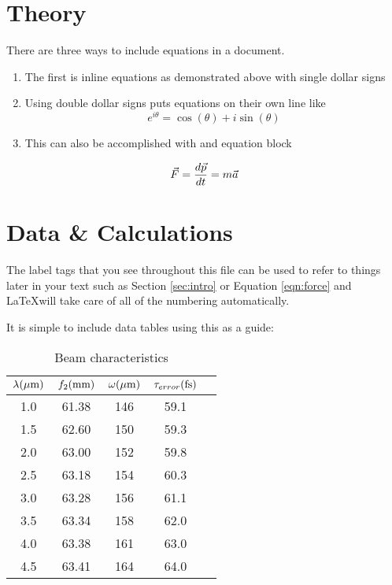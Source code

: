 \documentclass[10pt]{article}
\begin{document}
\section{Theory}
There are three ways to include equations in a document.
\begin{enumerate}
	\item The first is inline equations as demonstrated above with single dollar signs
	\item Using double dollar signs puts equations on their own line like $$e^{i \theta} = \cos(\theta) + i \sin(\theta)$$
	\item This can also be accomplished with and equation block
\end{enumerate}

\begin{equation} \label{eqn:force}
	\vec{F} = {d \vec{p} \over d t} = m \vec{a}
\end{equation}
	

\section{Data \& Calculations}
The label tags that you see throughout this file can be used to refer to things later in your text such as Section \ref{sec:intro} or Equation \ref{eqn:force} and \LaTeX will take care of all of the numbering automatically.

It is simple to include data tables using this as a guide:

\begin{table}[h]
\caption{Beam characteristics}
\begin{center}
\begin{tabular}{|c|c|c|c|c|}
\hline
$\lambda \rm (\mu m)$ & $f_2 \rm(mm)$ & $\omega \rm(\mu m)$ & $\tau_{error} \rm(fs)$  \\ \hline \hline
1.0	&	61.38	&	146		&	59.1\\ \hline
1.5	&	62.60	&	150		&	59.3\\ \hline
2.0	&	63.00	&	152		&	59.8\\ \hline
2.5	&	63.18	&	154		&	60.3\\ \hline
3.0	&	63.28	&	156		&	61.1\\ \hline
3.5	&	63.34	&	158		&	62.0\\ \hline
4.0	&	63.38	&	161		&	63.0\\ \hline
4.5	&	63.41	&	164		&	64.0\\ \hline
\end{tabular}
\end{center}
\label{tbl:beamsize}
\end{table}
\end{document}
